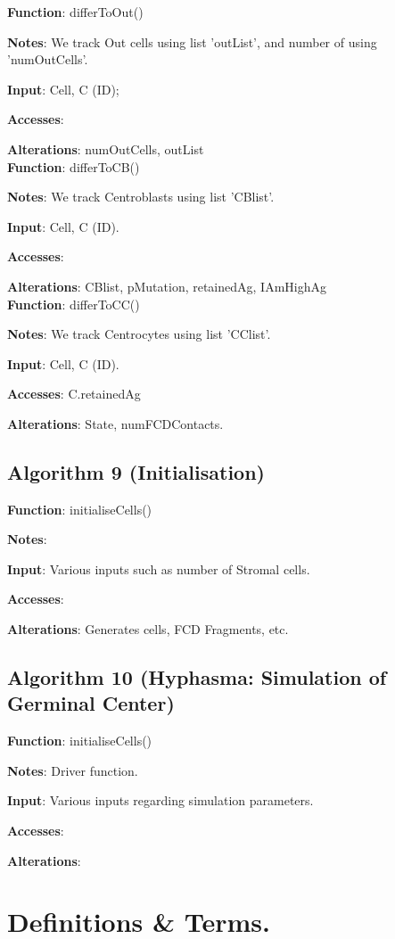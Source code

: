 \documentclass[english]{article}
\begin{document}
\textbf{Function}: differToOut()

\textbf{Notes}: We track Out cells using list 'outList', and number of using 'numOutCells'.

\textbf{Input}: Cell, C (ID);

\textbf{Accesses}:

\textbf{Alterations}: numOutCells, outList
\\
\textbf{Function}: differToCB()

\textbf{Notes}: We track Centroblasts using list 'CBlist'.

\textbf{Input}: Cell, C (ID). 

\textbf{Accesses}:

\textbf{Alterations}: CBlist, pMutation, retainedAg, IAmHighAg
\\
\textbf{Function}: differToCC()

\textbf{Notes}: We track Centrocytes using list 'CClist'. 

\textbf{Input}: Cell, C (ID). 

\textbf{Accesses}: C.retainedAg

\textbf{Alterations}: State, numFCDContacts. 


\subsection{Algorithm 9 (Initialisation)}

\textbf{Function}: initialiseCells()

\textbf{Notes}: 

\textbf{Input}: Various inputs such as number of Stromal cells. 

\textbf{Accesses}:

\textbf{Alterations}: Generates cells, FCD Fragments, etc. 


\subsection{Algorithm 10 (Hyphasma: Simulation of Germinal Center)}
	
\textbf{Function}: initialiseCells()

\textbf{Notes}: Driver function.

\textbf{Input}: Various inputs regarding simulation parameters. 

\textbf{Accesses}:

\textbf{Alterations}:

	
\section{Definitions \& Terms.}
\end{document}
